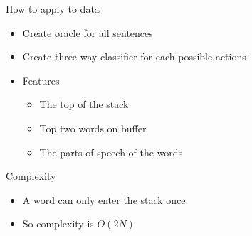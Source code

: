 \documentclass[compress]{beamer}
\begin{document}
\begin{frame}{How to apply to data}

  \begin{itemize}
    \item Create oracle for all sentences
    \item Create three-way classifier for each possible actions
    \item Features
      \begin{itemize}
        \item The top of the stack
        \item Top two words on buffer
        \item The parts of speech of the words
      \end{itemize}

  \end{itemize}

\end{frame}

\begin{frame}{Complexity}

  \pause
  \begin{itemize}
    \item A word can only enter the stack once
    \item So complexity is $O(2N)$
  \end{itemize}

\end{frame}
\end{document}
